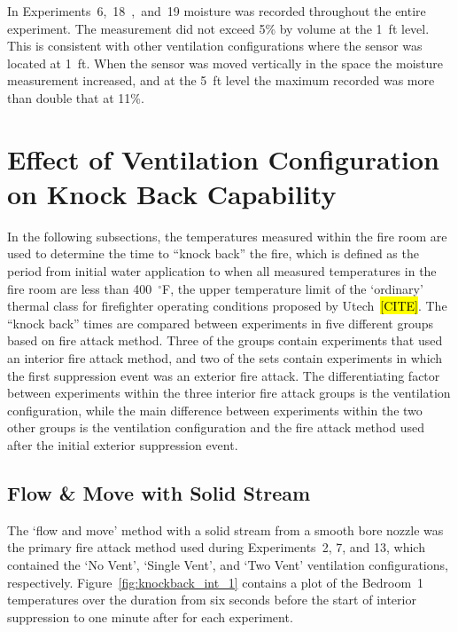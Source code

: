 \documentclass[12pt,oneside]{book}
\begin{document}
In Experiments~6,~18~,~and~19 moisture was recorded throughout the entire experiment. The measurement did not exceed 5\% by volume at the 1~ft level. This is consistent with other ventilation configurations where the sensor was located at 1~ft.  When the sensor was moved vertically in the space the moisture measurement increased, and at the 5~ft level the maximum recorded was more than double that at 11\%.   

\section{Effect of Ventilation Configuration on Knock Back Capability}
In the following subsections, the temperatures measured within the fire room are used to determine the time to ``knock back'' the fire, which is defined as the period from initial water application to when all measured temperatures in the fire room are less than 400~$^\circ$F, the upper temperature limit of the `ordinary' thermal class for firefighter operating conditions proposed by Utech~\hl{[CITE]}. The ``knock back'' times are compared between experiments in five different groups based on fire attack method. Three of the groups contain experiments that used an interior fire attack method, and two of the sets contain experiments in which the first suppression event was an exterior fire attack. The differentiating factor between experiments within the three interior fire attack groups is the ventilation configuration, while the main difference between experiments within the two other groups is the ventilation configuration and the fire attack method used after the initial exterior suppression event.

\subsection{Flow \& Move with Solid Stream}
The `flow and move' method with a solid stream from a smooth bore nozzle was the primary fire attack method used during Experiments~2, 7, and 13, which contained the `No Vent', `Single Vent', and `Two Vent' ventilation configurations, respectively. Figure~\ref{fig:knockback_int_1} contains a plot of the Bedroom~1 temperatures over the duration from six seconds before the start of interior suppression to one minute after for each experiment.
\end{document}
